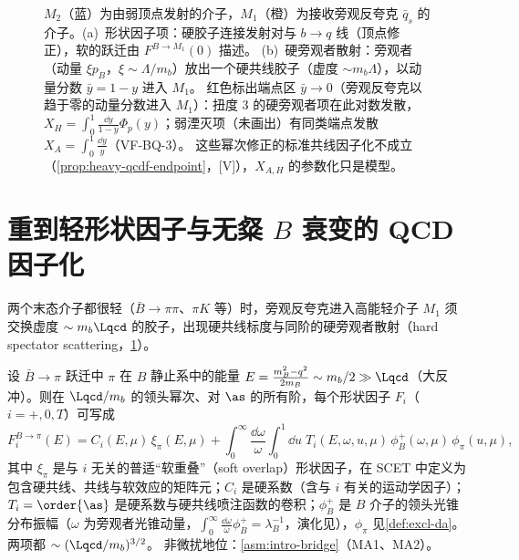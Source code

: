 \begin{figure}[htbp]
{$M_2$（蓝）为由弱顶点发射的介子，$M_1$（橙）为接收旁观反夸克 $\bar q_s$ 的介子。(a)~形状因子项：硬胶子连接发射对与 $b\to q$ 线（顶点修正），软的跃迁由 $F^{B\to M_1}(0)$ 描述。
(b)~硬旁观者散射：旁观者（动量 $\xi p_B$，$\xi\sim\Lambda/m_b$）放出一个硬共线胶子（虚度 $\sim m_b\Lambda$），以动量分数 $\bar y=1-y$ 进入 $M_1$。
红色标出端点区 $\bar y\to0$（旁观反夸克以趋于零的动量分数进入 $M_1$）：扭度 3 的硬旁观者项在此对数发散，$X_H=\int_0^1\frac{\dd y}{1-y}\Phi_p(y)$；弱湮灭项（未画出）有同类端点发散 $X_A=\int_0^1\frac{\dd y}{y}$（VF-BQ-3）。
这些幂次修正的标准共线因子化不成立（\cref{prop:heavy-qcdf-endpoint}，[V]），$X_{A,H}$ 的参数化只是模型。}
\label{fig:heavy-qcdf}
\end{figure}

\section{重到轻形状因子与无粲 $B$ 衰变的 QCD 因子化}\label{sec:heavy-qcdf}

两个末态介子都很轻（$\bar B\to\pi\pi$、$\pi K$ 等）时，旁观反夸克进入高能轻介子 $M_1$ 须交换虚度 $\sim m_b\Lqcd$ 的胶子，出现硬共线标度与同阶的硬旁观者散射（hard spectator scattering，\cref{fig:heavy-qcdf}）。

\begin{proposition}\label{prop:heavy-btopi-ff}
设 $\bar B\to\pi$ 跃迁中 $\pi$ 在 $B$ 静止系中的能量 $E=\frac{m_B^2-q^2}{2m_B}\sim m_b/2\gg\Lqcd$（大反冲）。则在 $\Lqcd/m_b$ 的领头幂次、对 $\as$ 的所有阶，每个形状因子 $F_i$（$i=+,0,T$）可写成
\begin{equation}\label{eq:heavy-btopi-ff}
F_i^{B\to\pi}(E)=C_i(E,\mu)\,\xi_\pi(E,\mu)+\int_0^\infty\frac{\dd\omega}{\omega}\int_0^1\dd u\;T_i(E,\omega,u,\mu)\,\phi_B^+(\omega,\mu)\,\phi_\pi(u,\mu),
\end{equation}
其中 $\xi_\pi$ 是与 $i$ 无关的普适“软重叠”（soft overlap）形状因子，在 SCET 中定义为包含硬共线、共线与软效应的矩阵元；$C_i$ 是硬系数（含与 $i$ 有关的运动学因子）；$T_i=\order{\as}$ 是硬系数与硬共线喷注函数的卷积；$\phi_B^+$ 是 $B$ 介子的领头光锥分布振幅（$\omega$ 为旁观者光锥动量，$\int_0^\infty\frac{\dd\omega}{\omega}\phi_B^+=\lambda_B^{-1}$\cite{Grozin:1996pq}，演化见\cite{Lange:2003ff}），$\phi_\pi$ 见\cref{def:excl-da}。两项都 $\sim(\Lqcd/m_b)^{3/2}$。
非微扰地位：\cref{asm:intro-bridge}（MA1、MA2）。
\end{proposition}

